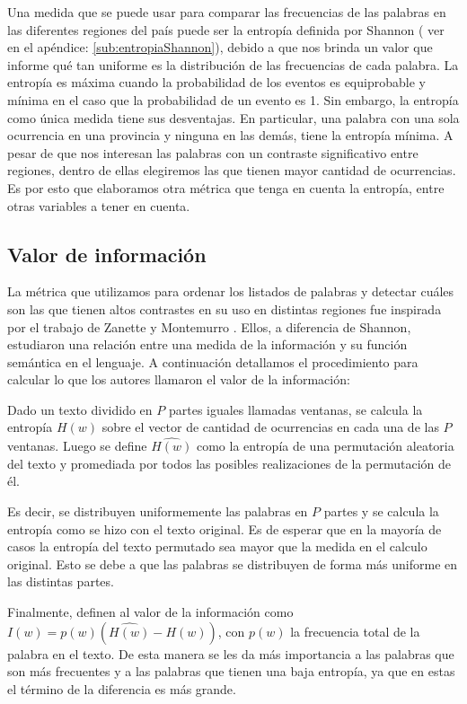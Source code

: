 Una medida que se puede usar para comparar las frecuencias de las palabras en las diferentes regiones del país puede ser la entropía definida por Shannon ( ver en el apéndice: \ref{sub:entropiaShannon}), debido a que nos brinda un valor que informe qué tan uniforme es la distribución de las frecuencias de cada palabra. La entropía es máxima cuando la probabilidad de los eventos es equiprobable y mínima en el caso que la probabilidad de un evento es 1.
Sin embargo, la entropía como única medida tiene sus desventajas. En particular, una palabra con una sola ocurrencia en una provincia y ninguna en las demás, tiene la entropía mínima. A pesar de que nos interesan las palabras con un contraste significativo entre regiones, dentro de ellas elegiremos las que tienen mayor cantidad de ocurrencias. Es por esto que elaboramos otra métrica que tenga en cuenta la entropía, entre otras variables a tener en cuenta.


\subsection{Valor de información}
La métrica que utilizamos para ordenar los listados de palabras y detectar cuáles son
las que tienen altos contrastes en su uso en distintas regiones fue inspirada por el
trabajo de Zanette y Montemurro \cite{montemurro2010towards}.
Ellos, a diferencia de Shannon, estudiaron una relación entre una medida de la información y su función semántica en el lenguaje.
A continuación detallamos el procedimiento para calcular lo que los autores llamaron
el valor de la información:

Dado un texto dividido en $P$ partes iguales llamadas ventanas, se calcula la entropía  $H(w)$ sobre el vector de cantidad de ocurrencias en cada una de las $P$ ventanas.
Luego se define $\widehat{H(w)}$  como la entropía de una permutación aleatoria del texto y promediada por todos las posibles realizaciones de la permutación de él. 

Es decir, se distribuyen uniformemente las palabras en $P$ partes y se calcula la
entropía como se hizo con el texto original. Es de esperar que en la mayoría de casos 
la entropía del texto permutado sea mayor que la medida en el calculo original. Esto 
se debe a que las palabras se distribuyen de forma más uniforme 
en las distintas partes.

Finalmente, definen al valor de la información como $I(w) = p(w) (\widehat{H(w)} - H(w))$, con $p(w)$ la frecuencia total de la palabra en el texto. 
De esta manera se les da más importancia a las palabras que son más frecuentes y a las palabras que tienen una baja entropía, ya que en estas el término de la diferencia es más grande.

